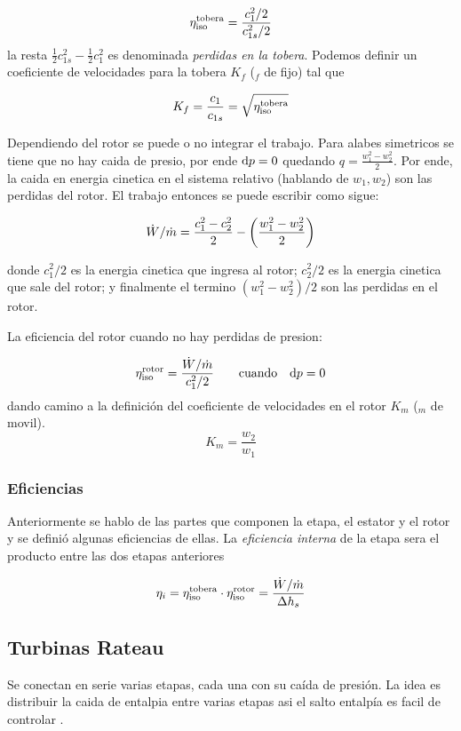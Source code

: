 \documentclass{article}
\begin{document}
\begin{equation}
    \eta_{\mathrm{iso}}^{\mathrm{tobera}}=\frac{c_{1}^2/2}{c_{1s}^2/2}
\end{equation}
la resta $\frac{1}{2}c^2_{1s} -\frac{1}{2}c^2_{1}$ es denominada \textit{perdidas en la tobera}. Podemos definir un coeficiente de velocidades para la tobera $K_f$ ($_f$ de fijo) tal que 

\[
K_f = \frac{c_1}{c_{1s}} = \sqrt{\eta_{\mathrm{iso}}^{\mathrm{tobera}}}
\]

Dependiendo del rotor se puede o no integrar el trabajo. Para alabes simetricos se tiene que no hay caida de presio, por ende $\textrm{d} p=0$ quedando $q=\frac{w_1^2 - w_2^2}{2}$. Por ende, la caida en energia cinetica en el sistema relativo (hablando de $w_1,w_2$) son las perdidas del rotor. El trabajo entonces se puede escribir como sigue:

\begin{equation*}
    \dot{W}/\dot{m} = \frac{c_1^2-c_2^2}{2} - \left( \frac{w_1^2-w_2^2}{2} \right)
\end{equation*}

donde $c_1^2/2$ es la energia cinetica que ingresa al rotor; $c_2^2/2$ es la energia cinetica que sale del rotor; y finalmente el termino $(w_1^2-w_2^2)/2$ son las perdidas en el rotor.

La eficiencia del rotor cuando no hay perdidas de presion:

\begin{equation}
    \eta_{\mathrm{iso}}^{\mathrm{rotor}} = \frac{\dot{W}/\dot{m} }{c_1^2/2} \qquad \mathrm{cuando} \quad \textrm{d} p = 0
\end{equation}
dando camino a la definición del coeficiente de velocidades en el rotor $K_m$ ($_m$ de movil).
\[
K_m = \frac{w_2}{w_1}
\]



\subsubsection{Eficiencias}
Anteriormente se hablo de las partes que componen la etapa, el estator y el rotor y se definió algunas eficiencias de ellas. La \textit{eficiencia interna} de la etapa sera el producto entre las dos etapas anteriores

\[
\eta_i = \eta_{\mathrm{iso}}^{\mathrm{tobera}}\cdot \eta_{\mathrm{iso}}^{\mathrm{rotor}} = \frac{\dot{W}/\dot{m}}{\Delta h_s}
\]

\subsection{Turbinas Rateau}
Se conectan en serie varias etapas, cada una con su caída de presión. La idea es distribuir la caida de entalpia entre varias etapas asi el salto entalpía es facil de controlar \cite{TurboDick}. 
\end{document}
